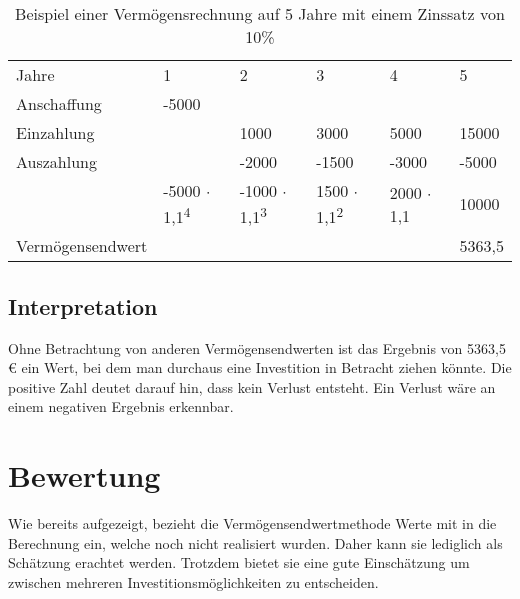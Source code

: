 \begin{table}[!h]
    \begin{tabular}{llllll}
        \cline{1-6} \rowcolor{gray}
        Jahre            & 1                                    & 2                                    & 3                                   & 4                & 5      \\ \cline{1-6} \rowcolor{white}
        Anschaffung      & -5000                                &                                      &                                     &                  &        \\ \cline{1-6} \rowcolor{white}
        Einzahlung       &                                      & 1000                                 & 3000                                & 5000             & 15000  \\ \cline{1-6} \rowcolor{white}
        Auszahlung       &                                      & -2000                                & -1500                               & -3000            & -5000  \\ \cline{1-6} \rowcolor{white}
                         & -5000 $\cdot$ 1,1\textsuperscript{4} & -1000 $\cdot$ 1,1\textsuperscript{3} & 1500 $\cdot$ 1,1\textsuperscript{2} & 2000 $\cdot$ 1,1 & 10000  \\ \rowcolor{white}
        Vermögensendwert &                                      &                                      &                                     &                  & 5363,5 \\ \cline{1-6}
    \end{tabular}
    \caption{Beispiel einer Vermögensrechnung auf 5 Jahre mit einem Zinssatz von 10\%}
    \label{tb:VermoegensendwertRechnung}
\end{table}

\subsection{Interpretation}

Ohne Betrachtung von anderen Vermögensendwerten ist das Ergebnis von 5363,5 € ein Wert, bei dem man durchaus eine Investition in Betracht ziehen könnte. Die positive Zahl deutet darauf hin, dass kein Verlust entsteht. Ein Verlust wäre an einem negativen Ergebnis erkennbar.

\section{Bewertung}

Wie bereits aufgezeigt, bezieht die Vermögensendwertmethode Werte mit in die Berechnung ein, welche noch nicht realisiert wurden. Daher kann sie lediglich als Schätzung erachtet werden. Trotzdem bietet sie eine gute Einschätzung um zwischen mehreren Investitionsmöglichkeiten zu entscheiden.
